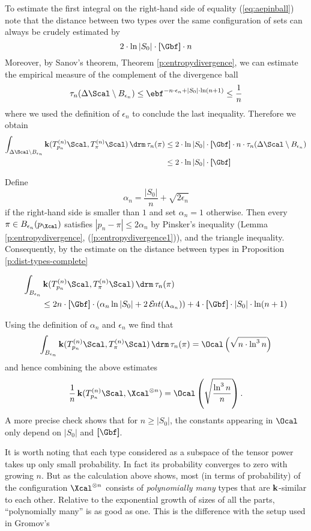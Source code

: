 \begin{Proof}
  To estimate the first integral on the right-hand side of equality (\ref{eq:aepinball}) note that the distance between two
  types over the same configuration of sets can always be crudely estimated
  by 
  \[
  2 \cdot \ln |S_0| \cdot \size{\Gbf} \cdot n
  \]
  Moreover, by Sanov's theorem, Theorem \ref{p:entropydivergence}, we can estimate the empirical measure of the complement of the divergence ball
  \[
  \tau_{n}(\Delta\Scal\setminus
  B_{\epsilon_{n}}) \leq \ebf^{-n\cdot\epsilon_{n}+|S_0| \cdot \ln (n+1)} \leq \frac{1}{n}
  \] 
  where we used the definition of $\epsilon_n$ to conclude the last inequality.
  Therefore we obtain
  \begin{align*}
    \int_{\Delta \Scal\setminus B_{\epsilon_{n}}}
    \ikd(T^{(n)}_{p_{n}}\Scal,T^{(n)}_{\pi}\Scal) \d\tau_{n}(\pi) 
    &\leq
    2 \cdot\ln |S_0| \cdot \size{\Gbf} \cdot n \cdot
    \tau_{n}(\Delta\Scal\setminus
    B_{\epsilon_{n}})
    \\
    &\leq 
    2 \cdot\ln |S_0| \cdot \size{\Gbf}
  \end{align*}
  
  Define
  \[
  \alpha_n 
  = 
  \frac{|S_0|}{n} + \sqrt{2 \epsilon_n }
  \]
  if the right-hand side is smaller than $1$ and set $\alpha_n=1$
  otherwise.  Then every $\pi \in B_{\epsilon_n}(p_\Xcal)$ satisfies
  $|p_n - \pi| \leq 2 \alpha_n$ by Pinsker's inequality (Lemma
  \ref{p:entropydivergence}, (\ref{p:entropydivergence1})), and the
  triangle inequality.  Consequently, by the estimate on the distance
  between types in Proposition \ref{p:dist-types-complete}
  
  \begin{align*}
  \int_{B_{\epsilon_{n}}}
  &\ikd(T^{(n)}_{p_{n}}\Scal,T^{(n)}_{\pi}\Scal)
  \d\tau_{n}(\pi)
  \\
  &\leq
  2n \cdot
  \size{\Gbf}
  \cdot
  \left( \alpha_n \ln |S_0| + 2 \ent(\Lambda_{\alpha_n}) \right)
    + 4\cdot \size{\Gbf} \cdot |S_{0}| \cdot \ln(n+1)
  \end{align*}
  
  Using the definition of $\alpha_n$ and $\epsilon_n$ we find that 
  \[
    \int_{B_{\epsilon_{n}}}
    \ikd(T^{(n)}_{p_{n}}\Scal,T^{(n)}_{\pi}\Scal)
    \d\tau_{n}(\pi) 
    = 
    \O\left(\sqrt{n \cdot \ln^{3} n} \right)
  \]
  and hence combining the above estimates
  \[
    \frac{1}{n}\ikd(T^{(n)}_{p_{n}}\Scal,\Xcal^{\otimes n}) 
    = 
    \O\left( \sqrt{\frac{\ln^3 n }{n}} \right).
  \]
  A more precise check shows that for $n \geq |S_0|$, the constants
  appearing in $\O$ only depend on $|S_0|$ and $\size{\Gbf}$.
\end{Proof}

\bigskip


  It is worth noting that each type considered as a subspace of the
  tensor power takes up only small probability. In fact its
  probability converges to zero with growing $n$. But as the
  calculation above shows, most (in terms of probability) of the
  configuration $\Xcal^{\otimes n}$ consists of \emph{polynomially
  many} types that are $\operatorname{\mathbf{k}}$-similar to each other. Relative to the
  exponential growth of sizes of all the parts, ``polynomially many''
  is as good as one.  This is the difference with the setup used in
  Gromov's \cite{Gromov-Search-2012}

